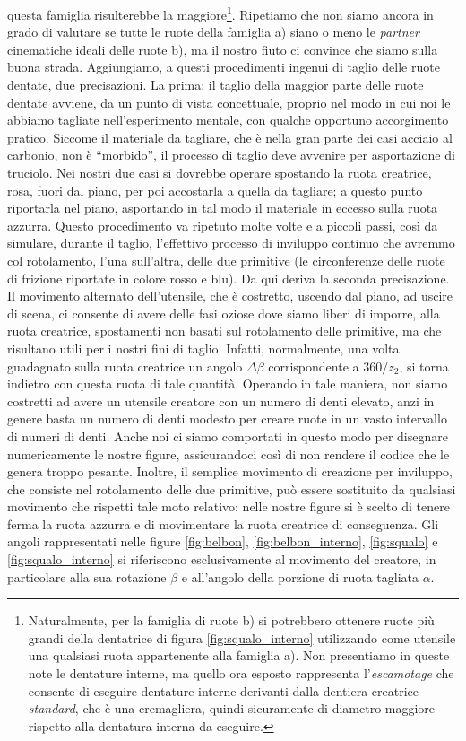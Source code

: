 questa famiglia risulterebbe la maggiore\footnote{
Naturalmente, per la famiglia di ruote b) si potrebbero ottenere
ruote pi\`u grandi
della dentatrice di figura \ref{fig:squalo_interno} utilizzando come
utensile una qualsiasi ruota
appartenente alla famiglia a). Non presentiamo in queste note le dentature
interne, ma quello ora esposto rappresenta l'{\em escamotage} che consente
di eseguire dentature interne derivanti dalla dentiera creatrice {\em standard},
che \`e una cremagliera, quindi sicuramente di diametro maggiore rispetto
alla dentatura interna da eseguire.
}.
Ripetiamo che non siamo ancora in grado di valutare  se tutte le ruote della
famiglia a) siano o meno le {\em partner} cinematiche ideali delle ruote b),
ma il nostro fiuto ci convince che  siamo sulla buona strada.
Aggiungiamo, a questi procedimenti ingenui di taglio delle ruote dentate, due
precisazioni.
La prima: il taglio
della maggior parte delle ruote dentate avviene, da un punto di vista
concettuale, proprio nel modo in cui noi le abbiamo tagliate
nell'esperimento mentale, con qualche opportuno accorgimento pratico.
Siccome il materiale da tagliare, che \`e nella gran parte dei casi
acciaio al carbonio, non \`e ``morbido'', il processo di taglio deve avvenire
per asportazione di truciolo. Nei nostri due casi si dovrebbe operare
spostando la ruota creatrice, rosa, fuori dal piano,
per poi accostarla a quella da tagliare; a questo punto
riportarla nel piano, asportando in tal modo il materiale in eccesso
sulla ruota azzurra. Questo procedimento va ripetuto molte volte e a 
piccoli passi, cos\`i da simulare, durante il taglio, l'effettivo
processo di inviluppo continuo che avremmo col rotolamento, l'una
sull'altra, delle due primitive (le circonferenze delle ruote di frizione
riportate in colore rosso e blu). Da qui deriva la seconda precisazione.
Il movimento alternato dell'utensile, che \`e costretto,
uscendo dal piano, ad uscire di scena,
ci consente di avere delle fasi oziose dove siamo
liberi di imporre, alla ruota creatrice, spostamenti non basati sul
rotolamento delle primitive, ma che risultano utili per i nostri fini di taglio.
Infatti, normalmente, una volta guadagnato sulla
ruota creatrice un angolo $\Delta \beta$
corrispondente a $360 /z_2$, si torna indietro con questa 
ruota di tale quantit\`a. Operando in tale maniera, non siamo
costretti ad avere un utensile creatore con un numero di denti elevato,
anzi in genere basta un numero di denti modesto per creare ruote in
un vasto intervallo di numeri di denti. Anche noi ci siamo comportati
in questo modo per disegnare numericamente le nostre figure,
assicurandoci cos\`i di non rendere il codice
che le genera troppo pesante. Inoltre, il semplice movimento di creazione
per inviluppo, che consiste nel rotolamento delle due primitive, pu\`o
essere sostituito da qualsiasi movimento che rispetti tale moto relativo:
nelle nostre figure si \`e scelto di tenere ferma la ruota azzurra e di
movimentare la ruota creatrice di conseguenza. Gli angoli rappresentati
nelle figure \ref{fig:belbon}, \ref{fig:belbon_interno}, \ref{fig:squalo} e
\ref{fig:squalo_interno} si riferiscono esclusivamente al movimento
del creatore, in particolare alla sua rotazione $\beta$ e all'angolo
della porzione di ruota tagliata $\alpha$.
 
